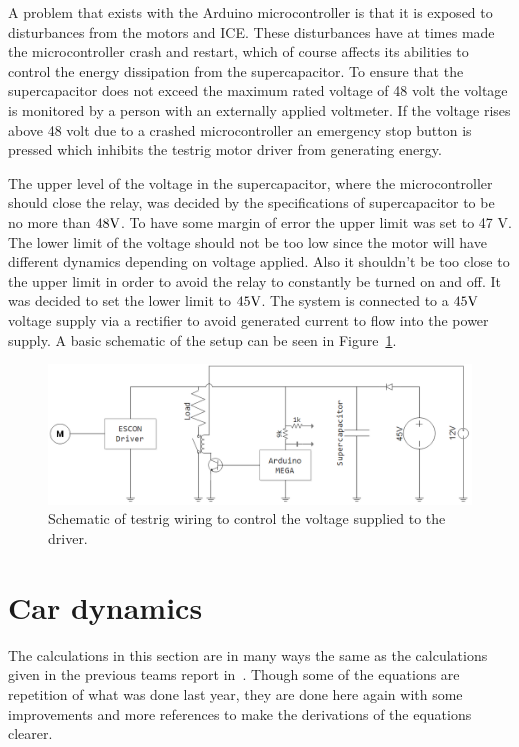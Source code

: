 A problem that exists with the Arduino microcontroller is that it is exposed to
disturbances from the motors and ICE\@. These disturbances have at times made the
microcontroller crash and restart, which of course affects its abilities to control the
energy dissipation from the supercapacitor. To ensure that the supercapacitor does not
exceed the maximum rated voltage of 48 volt the voltage is monitored by a person with an
externally applied voltmeter. If the voltage rises above 48 volt due to a crashed
microcontroller an emergency stop button is pressed which inhibits the testrig motor
driver from generating energy. 

The upper level of the voltage in the supercapacitor, where the microcontroller should
close the relay, was decided by the specifications of supercapacitor to be no more than
$48\textnormal{V}$. To have some margin of error the upper limit was set to 47 V. The
lower limit of the voltage should not be too low since the motor will have different
dynamics depending on voltage applied. Also it shouldn't be too close to the upper limit
in order to avoid the relay to constantly be turned on and off. It was decided to set the
lower limit to $45\textnormal{V}$. The system is connected to a $45\textnormal{V}$
voltage supply via a rectifier to avoid generated current to flow into the power supply.
A basic schematic of the setup can be seen in Figure~\ref{fig:testrig_schematic}.
\begin{figure}[H]
    \centering
    \includegraphics[width=\textwidth]{./img/testrig_schematic.png}
    \caption{Schematic of testrig wiring to control the voltage supplied to the driver.}\label{fig:testrig_schematic}
\end{figure}
\section{Car dynamics}\label{sec:cardynamics}
The calculations in this section are in many ways the same as the calculations
given in the previous teams report in~\cite{elba2015}. Though some
of the equations are repetition of what was done last year, they are
done here again with some improvements and more references to make the
derivations of the equations clearer.

